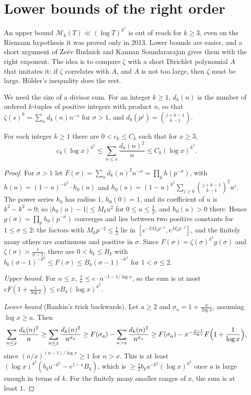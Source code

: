 \section{Lower bounds of the right order}

An upper bound $\mathcal M_k(T)\ll(\log T)^{k^2}$ is out of reach for $k\ge3$, even on the Riemann hypothesis it was proved only in 2013. Lower bounds are easier, and a short argument of Zeév Rudnick and Kannan Soundararajan gives them with the right exponent. The idea is to compare $\zeta$ with a short Dirichlet polynomial $A$ that imitates it: if $\zeta$ correlates with $A$, and $A$ is not too large, then $\zeta$ must be large. Hölder's inequality does the rest.

We need the size of a divisor sum. For an integer $k\ge1$, $d_k(n)$ is the number of ordered $k$-tuples of positive integers with product $n$, so that $\zeta(s)^k=\sum_nd_k(n)n^{-s}$ for $\sigma>1$, and $d_k(p^j)=\binom{j+k-1}{k-1}$.

\begin{lemma}\label{lem:dk2}
For each integer $k\ge1$ there are $0<c_k\le C_k$ such that for $x\ge3$,
\[
c_k(\log x)^{k^2}\le\sum_{n\le x}\frac{d_k(n)^2}n\le C_k(\log x)^{k^2}.
\]
\end{lemma}
\begin{proof}
For $\sigma>1$ let $F(\sigma)=\sum_nd_k(n)^2n^{-\sigma}=\prod_ph(p^{-\sigma})$, with $h(u)=(1-u)^{-k^2}\cdot h_0(u)$ and $h_0(u)=(1-u)^{k^2}\sum_{j\ge0}\binom{j+k-1}{k-1}^2u^j$. The power series $h_0$ has radius $1$, $h_0(0)=1$, and its coefficient of $u$ is $k^2-k^2=0$; so $|h_0(u)-1|\le M_ku^2$ for $0\le u\le\frac12$, and $h_0(u)>0$ there. Hence $g(\sigma)=\prod_ph_0(p^{-\sigma})$ converges and lies between two positive constants for $1\le\sigma\le2$: the factors with $M_kp^{-2}\le\frac12$ lie in $[e^{-2M_kp^{-2}},e^{M_kp^{-2}}]$, and the finitely many others are continuous and positive in $\sigma$. Since $F(\sigma)=\zeta(\sigma)^{k^2}g(\sigma)$ and $\zeta(\sigma)\asymp\frac1{\sigma-1}$, there are $0<b_k\le B_k$ with $b_k(\sigma-1)^{-k^2}\le F(\sigma)\le B_k(\sigma-1)^{-k^2}$ for $1<\sigma\le2$.

\emph{Upper bound.} For $n\le x$, $\frac1n\le e\cdot n^{-1-1/\log x}$, so the sum is at most $eF(1+\frac1{\log x})\le eB_k(\log x)^{k^2}$.

\emph{Lower bound} (Rankin's trick backwards). Let $a\ge2$ and $\sigma_a=1+\frac a{\log x}$, assuming $\log x\ge a$. Then
\[
\sum_{n\le x}\frac{d_k(n)^2}n\ge\sum_{n\le x}\frac{d_k(n)^2}{n^{\sigma_a}}\ge F(\sigma_a)-\sum_{n>x}\frac{d_k(n)^2}{n^{\sigma_a}}\ge F(\sigma_a)-x^{-\frac{a-1}{\log x}}F\Bigl(1+\frac1{\log x}\Bigr),
\]
since $(n/x)^{(a-1)/\log x}\ge1$ for $n>x$. This is at least $(\log x)^{k^2}(b_ka^{-k^2}-e^{1-a}B_k)$, which is $\ge\frac12b_ka^{-k^2}(\log x)^{k^2}$ once $a$ is large enough in terms of $k$. For the finitely many smaller ranges of $x$, the sum is at least $1$.
\end{proof}

